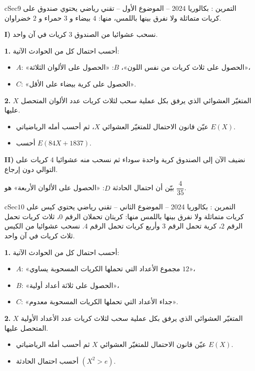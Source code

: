 \documentclass[12pt,a4paper]{article}
\newenvironment{BOX}[2]{\begin{otherlanguage}{english}\begin{arbox}{#1}{#2}}{\end{arbox}\end{otherlanguage}}
\newcounter{exo}
\newenvironment{tamrin}[1]{\stepcounter{exo}\begin{BOX}{cSec}{التمرين \theexo: #1}}{\end{BOX}}
\newenvironment{sq}{\begin{itemize}[leftmargin=2.4em,itemsep=3pt]}{\end{itemize}}
\newcommand{\qa}{\item[(أ)]}\newcommand{\qb}{\item[(ب)]}\newcommand{\qc}{\item[(جـ)]}\newcommand{\qd}{\item[(د)]}\newcommand{\qe}{\item[(هـ)]}
\newcommand{\QQ}[1]{\par\smallskip\textbf{#1.} }
\begin{document}
\begin{tamrin}{بكالوريا 2024 -- الموضوع الأول -- تقني رياضي}
يحتوي صندوق على $9$ كريات متماثلة ولا نفرق بينها باللمس، منها: $4$ بيضاء و $3$ حمراء و $2$ خضراوان.

\textbf{I)} نسحب عشوائيا من الصندوق $3$ كريات في آن واحد.
\QQ{1} أحسب احتمال كل من الحوادث الآتية:
\begin{itemize}
\item $A$: «الحصول على ثلاث كريات من نفس اللون»، \quad $B$: «الحصول على الألوان الثلاثة»،
\item $C$: «الحصول على كرية بيضاء على الأقل».
\end{itemize}
\QQ{2} $X$ المتغيّر العشوائي الذي يرفق بكل عملية سحب لثلاث كريات عدد الألوان المتحصل عليها.
\begin{sq}
\qa عيّن قانون الاحتمال للمتغيّر العشوائي $X$، ثم أحسب أمله الرياضياتي $E(X)$.
\qb أحسب $E(84X+1837)$.
\end{sq}
\textbf{II)} نضيف الآن إلى الصندوق كرية واحدة سوداء ثم نسحب منه عشوائيا $4$ كريات على التوالي دون إرجاع.

بيّن أن احتمال الحادثة $D$: «الحصول على الألوان الأربعة» هو $\dfrac{4}{35}$.
\end{tamrin}

\begin{tamrin}{بكالوريا 2024 -- الموضوع الثاني -- تقني رياضي}
يحتوي كيس على $10$ كريات متماثلة ولا نفرق بينها باللمس منها: كريتان تحملان الرقم $0$، ثلاث كريات تحمل الرقم $2$، كرية تحمل الرقم $3$ وأربع كريات تحمل الرقم $4$. نسحب عشوائيا من الكيس ثلاث كريات في آن واحد.
\QQ{1} أحسب احتمال كل من الحوادث الآتية:
\begin{itemize}
\item $A$: «مجموع الأعداد التي تحملها الكريات المسحوبة يساوي $12$»،
\item $B$: «الحصول على ثلاثة أعداد أولية»،
\item $C$: «جداء الأعداد التي تحملها الكريات المسحوبة معدوم».
\end{itemize}
\QQ{2} $X$ المتغيّر العشوائي الذي يرفق بكل عملية سحب لثلاث كريات عدد الأعداد الأولية المتحصل عليها.
\begin{sq}
\qa عيّن قانون الاحتمال للمتغيّر العشوائي $X$ ثم أحسب أمله الرياضياتي $E(X)$.
\qb أحسب احتمال الحادثة $(X^2>e)$.
\end{sq}
\end{tamrin}
\end{document}
